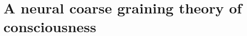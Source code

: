 \documentclass[utf8]{article}
\begin{document}
        





	\section{A neural coarse graining theory of consciousness}\label{sec:OurTheory}
	
\end{document}
